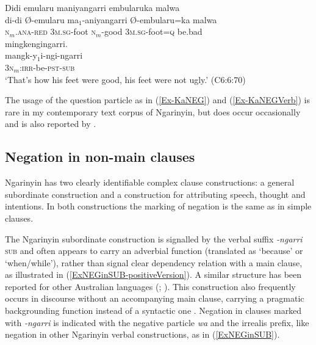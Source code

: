 \documentclass[output=paper,colorlinks,citecolor=brown]{langscibook}
\begin{document}
\begin{exe}
\ex \label{Ex-KaNEGVerb}
\glll Didi emularu maniyangarri embularuka malwa \\
di-di {\O}-emularu ma$_1$-aniyangarri {\O}-embularu=ka malwa\\
\textsc{n}$_m$.\textsc{ana-red} 3\textsc{m.sg}-foot \textsc{n}$_m$-good 3\textsc{m.sg}-foot=\textsc{q} be.bad\\

\glll  mingkengingarri.\\
       mangk-y$_1$i-ngi-ngarri\\
      3\textsc{n}$_m$:\textsc{irr}-be-\textsc{pst}-\textsc{sub}\\

\trans `That's how his feet were good, his feet were not ugly.' (C6:6:70)
\end{exe}

The usage of the question particle as in (\ref{Ex-KaNEG}) and (\ref{Ex-KaNEGVerb}) is rare in my contemporary text corpus of Ngarinyin, but does occur occasionally and is also reported by \citet{Rumsey1982}.

\subsection{Negation in non-main clauses}\label{ExNonMainClauses}

Ngarinyin has two clearly identifiable complex clause constructions: a general subordinate construction and a construction for attributing speech, thought and intentions. In both constructions the marking of negation is the same as in simple clauses.

The Ngarinyin subordinate construction is signalled by the verbal suffix \textit{-ngarri} \textsc{sub} and often appears to carry an adverbial function (translated as `because' or `when/while'), rather than signal clear dependency relation with a main clause, as illustrated in (\ref{ExNEGinSUB-positiveVersion}). A similar structure has been reported for other Australian languages (\citealt{Hale1976}; \citealt{Nordlinger2006}). This construction also frequently occurs in discourse without an accompanying main clause, carrying a pragmatic backgrounding function instead of a syntactic one \citep[cf.][]{Mithun2008extension}. Negation in clauses marked with \textit{-ngarri} is indicated with the negative particle \textit{wa} and the irrealis prefix, like negation in other Ngarinyin verbal constructions, as in (\ref{ExNEGinSUB}).
\end{document}
